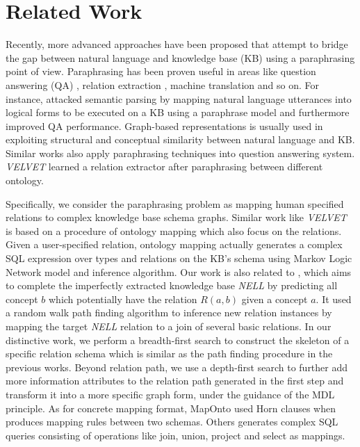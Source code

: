 \section{Related Work}


Recently, more advanced approaches have been proposed that attempt to bridge the gap between natural language and knowledge base (KB) using a paraphrasing point of view. Paraphrasing has been proven useful in areas like question answering (QA) \cite{harabagiu2006methods}, relation extraction \cite{romano2006investigating}, machine translation and so on. For instance, \citeauthor{berant2014semantic}  attacked semantic parsing by mapping natural language utterances into logical forms to be executed on a KB using a paraphrase model and furthermore improved QA performance. Graph-based representations \cite{reddy2014large} is usually used in exploiting structural and conceptual similarity between natural language and KB. Similar works \cite{fader2013paraphrase,berant2013semantic,kwiatkowski2013scaling} also apply paraphrasing techniques into question answering system. \textit{VELVET} \cite{zhang2012ontological} learned a relation extractor after paraphrasing between different ontology.

Specifically, we consider the paraphrasing problem as mapping human specified relations to complex knowledge base schema graphs. Similar work like \textit{VELVET} \cite{zhang2012ontological} is based on a procedure of ontology mapping which also focus on the relations. Given a user-specified relation, ontology mapping actually generates a complex SQL expression over types and relations on the KB's schema using Markov Logic Network model and inference algorithm. Our work is also related to \citeauthor{lao2011random} , which aims to complete the imperfectly extracted knowledge base \textit{NELL} \cite{carlson2010toward} by predicting all concept $b$ which potentially have the relation $R(a, b)$ given a concept $a$. It used a random walk path finding algorithm to inference new relation instances by mapping the target \textit{NELL} relation to a join of several basic relations. In our distinctive work, we perform a breadth-first search to construct the skeleton of a specific relation schema which is similar as the path finding procedure in the previous works. Beyond relation path, we use a depth-first search to further add more information attributes to the relation path generated in the first step and transform it into a more specific graph form, under the guidance of the MDL principle. As for concrete mapping format,
MapOnto \cite{an2006discovering} used Horn clauses when produces mapping rules between two schemas. Others \cite{zhang2012ontological,} generates complex SQL queries consisting of operations like join, union, project and select as mappings.

